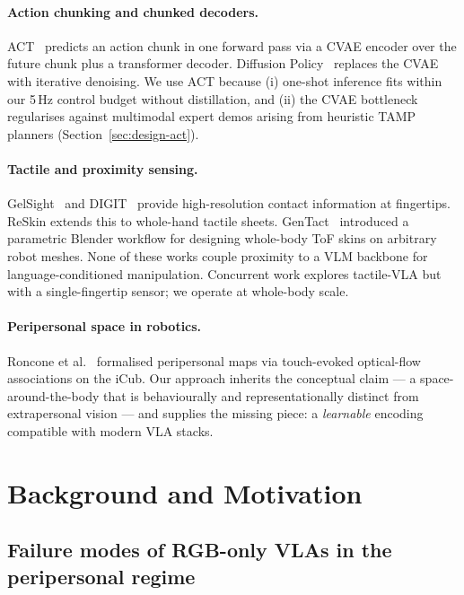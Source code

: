 \documentclass[11pt]{article}
\begin{document}
\paragraph{Action chunking and chunked decoders.}
ACT~\citep{zhao2023learning} predicts an action chunk in one forward
pass via a CVAE encoder over the future chunk plus a transformer
decoder. Diffusion Policy~\citep{chi2023diffusion} replaces the CVAE
with iterative denoising. We use ACT because (i) one-shot inference fits
within our 5\,Hz control budget without distillation, and (ii) the CVAE
bottleneck regularises against multimodal expert demos arising from
heuristic TAMP planners (Section~\ref{sec:design-act}).

\paragraph{Tactile and proximity sensing.}
GelSight~\citep{yuan2017gelsight} and DIGIT~\citep{lambeta2020digit}
provide high-resolution contact information at fingertips. ReSkin
\citep{bhirangi2021reskin} extends this to whole-hand tactile sheets.
GenTact~\citep{patel2023gentact} introduced a parametric Blender
workflow for designing whole-body ToF skins on arbitrary robot meshes.
None of these works couple proximity to a VLM backbone for
language-conditioned manipulation. Concurrent work explores tactile-VLA
\citep{tactilevla2025} but with a single-fingertip sensor; we operate at
whole-body scale.

\paragraph{Peripersonal space in robotics.}
Roncone et al.~\citep{roncone2016peripersonal} formalised peripersonal
maps via touch-evoked optical-flow associations on the iCub. Our approach
inherits the conceptual claim --- a space-around-the-body that is
behaviourally and representationally distinct from extrapersonal vision
--- and supplies the missing piece: a \emph{learnable} encoding compatible
with modern VLA stacks.

\section{Background and Motivation}
\label{sec:background}

\subsection{Failure modes of RGB-only VLAs in the peripersonal regime}
\label{sec:bg-failure}
\end{document}

